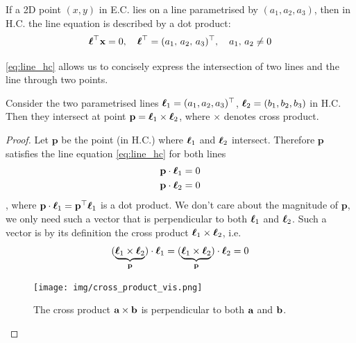 \documentclass[a4paper]{article}
\begin{document}
\begin{corollary}
If a 2D point  $(x,y)$ in E.C.  lies on a line parametrised by $(a_1,a_2,a_3)$, then in H.C. the line equation is described by a dot product:
\begin{equation}
    \boldsymbol{\ell}^{\top} \textbf{\textup{x}}  = 0, \quad \boldsymbol{\ell}^{\top} = (a_1,\, a_2,\, a_3)^{\top}, \quad a_1,\, a_2 \neq 0
    \label{eq:line_hc}
\end{equation}
\end{corollary}
\eqref{eq:line_hc} allows us to concisely express the intersection of two lines and the line through two points.
\begin{corollary}
Consider the two parametrised lines $\boldsymbol{\ell}_1 = (a_1,a_2,a_3)^{\top}$, $\boldsymbol{\ell}_2 = (b_1,b_2,b_3)$ in H.C. Then they intersect at point $\textbf{p} = \boldsymbol{\ell}_1 \times \boldsymbol{\ell}_2$, where $\times$ denotes cross product.
\label{cor:inters_lines_hc}
\end{corollary}
\begin{proof}
Let $\textbf{p}$ be the point (in H.C.) where $\boldsymbol{\ell}_1$ and $\boldsymbol{\ell}_2$ intersect. Therefore $\textbf{p}$ satisfies the line equation \eqref{eq:line_hc} for both lines
\begin{align*}
    \textbf{p} \cdot \boldsymbol{\ell}_1 = 0\\
    \textbf{p} \cdot \boldsymbol{\ell}_2 = 0
\end{align*}
, where $\textbf{p} \cdot \boldsymbol{\ell}_1 =\textbf{p} ^{\top} \boldsymbol{\ell}_1$ is a dot product. We don't care about the magnitude of $\textbf{p}$, we only need such a vector that is perpendicular to both $\boldsymbol{\ell}_1$ and $\boldsymbol{\ell}_2$. Such a vector is by its definition the cross product $\boldsymbol{\ell}_1\times \boldsymbol{\ell}_2$, i.e.
\[
(\underbrace{\boldsymbol{\ell}_1\times \boldsymbol{\ell}_2}_{\textbf{p}})\cdot \boldsymbol{\ell}_1 = (\underbrace{\boldsymbol{\ell}_1\times \boldsymbol{\ell}_2}_{\textbf{p}})\cdot \boldsymbol{\ell}_2 = 0
\]
\begin{figure}[H]
    \centering
    \texttt{[image: img/cross\_product\_vis.png]}
    \caption{The cross product $\textbf{a}\times \textbf{b}$ is perpendicular to both $\textbf{a}$ and $\textbf{b}$.}
    \label{fig:my_label}
\end{figure}
\end{proof}
\end{document}
